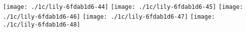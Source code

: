 \fi
\texttt{[image: ./1c/lily-6fdab1d6-44]}%
\ifx\betweenLilyPondSystem \undefined
  \linebreak
\else
  \expandafter{}%
\fi
\texttt{[image: ./1c/lily-6fdab1d6-45]}%
\ifx\betweenLilyPondSystem \undefined
  \linebreak
\else
  \expandafter{}%
\fi
\texttt{[image: ./1c/lily-6fdab1d6-46]}%
\ifx\betweenLilyPondSystem \undefined
  \linebreak
\else
  \expandafter{}%
\fi
\texttt{[image: ./1c/lily-6fdab1d6-47]}%
\ifx\betweenLilyPondSystem \undefined
  \linebreak
\else
  \expandafter{}%
\fi
\texttt{[image: ./1c/lily-6fdab1d6-48]}%
